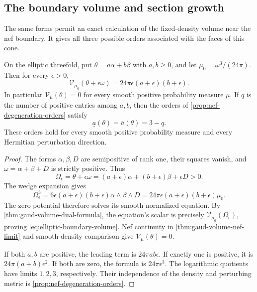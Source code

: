 \subsection{The boundary volume and section growth}
\label{sec:elliptic-boundary-volume}

The same forms permit an exact calculation of the fixed-density volume near the nef boundary. It gives all three possible orders associated with the faces of this cone.

\begin{proposition}\label{prop:elliptic-boundary-volume}
On the elliptic threefold, put $\theta=a\alpha+b\beta$ with $a,b\geq0$, and let $\mu_0=\omega^3/(24\pi)$. Then for every $\epsilon>0$,
\begin{equation}\label{eq:elliptic-boundary-volume}
 \mathcal V_{\mu_0}(\theta+\epsilon\omega)
       =24\pi\epsilon(a+\epsilon)(b+\epsilon).
\end{equation}
In particular $\mathcal V_\mu(\theta)=0$ for every smooth positive probability measure $\mu$. If $q$ is the number of positive entries among $a,b$, then the orders of \cref{prop:nef-degeneration-orders} satisfy
\[
 \underline a(\theta)=\overline a(\theta)=3-q.
\]
These orders hold for every smooth positive probability measure and every Hermitian perturbation direction.
\end{proposition}
\begin{proof}
The forms $\alpha,\beta,D$ are semipositive of rank one, their squares vanish, and $\omega=\alpha+\beta+D$ is strictly positive. Thus
\[
 \Omega_\epsilon=\theta+\epsilon\omega
       =(a+\epsilon)\alpha+(b+\epsilon)\beta+\epsilon D>0.
\]
The wedge expansion gives
\[
 \Omega_\epsilon^3
   =6\epsilon(a+\epsilon)(b+\epsilon)\alpha\wedge\beta\wedge D
   =24\pi\epsilon(a+\epsilon)(b+\epsilon)\mu_0.
\]
The zero potential therefore solves its smooth normalized equation. By \cref{thm:gaud-volume-dual-formula}, the equation's scalar is precisely $\mathcal V_{\mu_0}(\Omega_\epsilon)$, proving \eqref{eq:elliptic-boundary-volume}. Nef continuity in \cref{thm:gaud-volume-nef-limit} and smooth-density comparison give $\mathcal V_\mu(\theta)=0$.

If both $a,b$ are positive, the leading term is $24\pi ab\epsilon$. If exactly one is positive, it is $24\pi(a+b)\epsilon^2$. If both are zero, the formula is $24\pi\epsilon^3$. The logarithmic quotients have limits $1,2,3$, respectively. Their independence of the density and perturbing metric is \cref{prop:nef-degeneration-orders}.
\end{proof}

